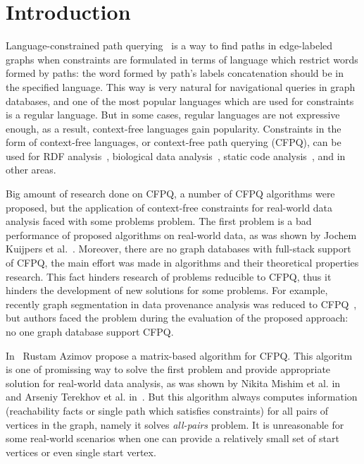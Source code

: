 \section{Introduction}

Language-constrained path querying~\cite{doi:10.1137/S0097539798337716} is a way to find paths in edge-labeled graphs when constraints are formulated in terms of language which restrict words formed by paths: the word formed by path's labels concatenation should be in the specified language.
This way is very natural for navigational queries in graph databases, and one of the most popular languages which are used for constraints is a regular language. 
But in some cases, regular languages are not expressive enough, as a result, context-free languages gain popularity.
Constraints in the form of context-free languages, or context-free path querying (CFPQ), can be used for RDF analysis~\cite{10.1007/978-3-319-46523-4_38}, biological data analysis~\cite{SubgraphQueriesbyContextfreeGrammars}, static code analysis~\cite{Zheng,10.1145/373243.360208}, and in other areas.

Big amount of research done on CFPQ, a number of CFPQ algorithms were proposed, but the application of context-free constraints for real-world data analysis faced with some problems problem.
The first problem is a bad performance of proposed algorithms on real-world data, as was shown by Jochem Kuijpers et al.~\cite{Kuijpers:2019:ESC:3335783.3335791}.
Moreover, there are no graph databases with full-stack support of CFPQ, the main effort was made in algorithms and their theoretical properties research.
This fact hinders research of problems reducible to CFPQ, thus it hinders the development of new solutions for some problems.
For example, recently graph segmentation in data provenance analysis was reduced to CFPQ~\cite{8731467}, but authors faced the problem during the evaluation of the proposed approach: no one graph database support CFPQ.

In~\cite{Azimov:2018:CPQ:3210259.3210264} Rustam Azimov propose a matrix-based algorithm for CFPQ.
This algoritm is one of promissing way to solve the first problem and provide appropriate solution for real-world data analysis, as was shown by Nikita Mishim et al. in~\cite{Mishin:2019:ECP:3327964.3328503} and Arseniy Terekhov et al. in~\cite{10.1145/3398682.3399163}. 
But this algorithm always computes information (reachability facts or single path which satisfies constraints) for all pairs of vertices in the graph, namely it solves \textit{all-pairs} problem.
It is unreasonable for some real-world scenarios when one can provide a relatively small set of start vertices or even single start vertex. 

